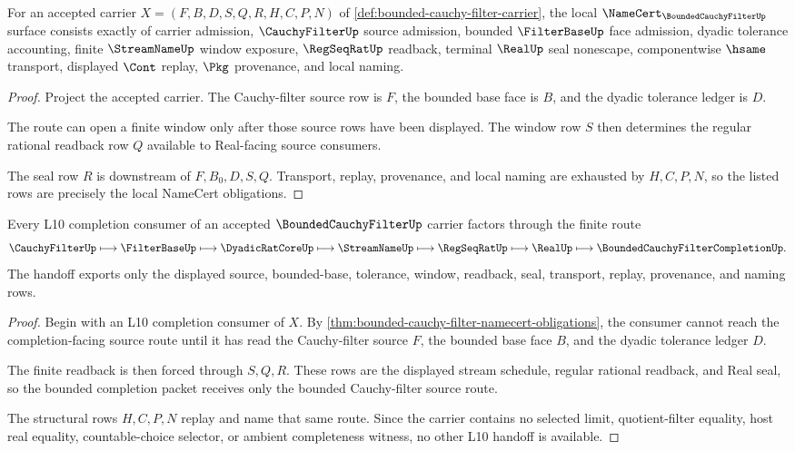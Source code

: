 \begin{theorem}
\label{thm:bounded-cauchy-filter-namecert-obligations}
For an accepted carrier $X=(F,B,D,S,Q,R,H,C,P,N)$ of \autoref{def:bounded-cauchy-filter-carrier}, the local $\NameCert_{\BoundedCauchyFilterUp}$ surface consists exactly of carrier admission, $\CauchyFilterUp$ source admission, bounded $\FilterBaseUp$ face admission, dyadic tolerance accounting, finite $\StreamNameUp$ window exposure, $\RegSeqRatUp$ readback, terminal $\RealUp$ seal nonescape, componentwise $\hsame$ transport, displayed $\Cont$ replay, $\Pkg$ provenance, and local naming.
\end{theorem}
\begin{proof}
Project the accepted carrier. The Cauchy-filter source row is $F$, the bounded base face is $B$, and the dyadic tolerance ledger is $D$.

The route can open a finite window only after those source rows have been displayed. The window row $S$ then determines the regular rational readback row $Q$ available to Real-facing source consumers.

The seal row $R$ is downstream of $F,B_0,D,S,Q$. Transport, replay, provenance, and local naming are exhausted by $H,C,P,N$, so the listed rows are precisely the local NameCert obligations.
\end{proof}

\begin{theorem}
\label{thm:bounded-cauchy-filter-l10-handoff}
Every L10 completion consumer of an accepted $\BoundedCauchyFilterUp$ carrier factors through the finite route
$$
\CauchyFilterUp \longmapsto \FilterBaseUp \longmapsto \DyadicRatCoreUp \longmapsto \StreamNameUp \longmapsto \RegSeqRatUp \longmapsto \RealUp \longmapsto \BoundedCauchyFilterCompletionUp .
$$
The handoff exports only the displayed source, bounded-base, tolerance, window, readback, seal, transport, replay, provenance, and naming rows.
\end{theorem}
\begin{proof}
Begin with an L10 completion consumer of $X$. By \autoref{thm:bounded-cauchy-filter-namecert-obligations}, the consumer cannot reach the completion-facing source route until it has read the Cauchy-filter source $F$, the bounded base face $B$, and the dyadic tolerance ledger $D$.

The finite readback is then forced through $S,Q,R$. These rows are the displayed stream schedule, regular rational readback, and Real seal, so the bounded completion packet receives only the bounded Cauchy-filter source route.

The structural rows $H,C,P,N$ replay and name that same route. Since the carrier contains no selected limit, quotient-filter equality, host real equality, countable-choice selector, or ambient completeness witness, no other L10 handoff is available.
\end{proof}

